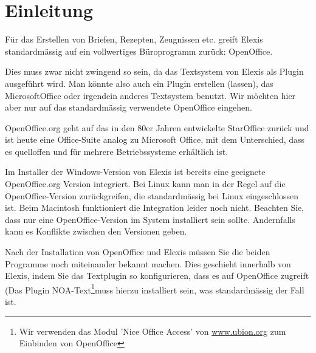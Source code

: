 
\section{Einleitung}
Für das Erstellen von Briefen, Rezepten, Zeugnissen etc. greift Elexis
standardmässig auf ein vollwertiges Büroprogramm zurück: OpenOffice.

Dies muss zwar nicht zwingend so sein, da das Textsystem von Elexis als Plugin
ausgeführt wird. Man könnte also auch ein Plugin erstellen (lassen), das
Microsoft\texttrademark{}Office\texttrademark{} oder irgendein anderes Textsystem
benutzt. Wir möchten hier aber nur auf das standardmässig verwendete OpenOffice
eingehen.

OpenOffice.org geht auf das in den 80er Jahren entwickelte StarOffice zurück und
ist heute eine Office-Suite analog zu Microsoft Office, mit dem Unterschied,
dass es quelloffen und für mehrere Betriebssysteme erhältlich ist.

Im Installer der Windows-Version von Elexis ist bereits eine geeignete OpenOffice.org Version integriert. Bei Linux kann man in der Regel auf die OpenOffice-Version zurückgreifen, die standardmässig bei Linux eingeschlossen ist. Beim Macintosh funktioniert die Integration leider noch nicht.
Beachten Sie, dass nur eine OpenOffice-Version im System installiert sein sollte. Andernfalls kann es Konflikte zwischen den Versionen geben.

\medskip

Nach der Installation von OpenOffice und Elexis müssen Sie die beiden Programme
noch miteinander bekannt machen. Dies geschieht innerhalb von Elexis, indem Sie
das Textplugin so konfigurieren, dass es auf OpenOffice zugreift (Das Plugin
\glqq NOA-Text\footnote{Wir verwenden das Modul 'Nice Office Access' von \href{http://www.ubion.org}{www.ubion.org}
 zum Einbinden von OpenOffice}\grqq{}muss hierzu installiert sein, was standardmässig der Fall ist.

